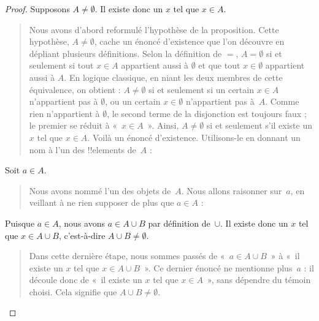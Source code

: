 \documentclass[../../../include/open-logic-section]{subfiles}
\begin{document}
\begin{proof}
  Supposons $A \neq \emptyset$. Il existe donc
  un $x$ tel que $x \in A$.
  \begin{quote}
    Nous avons d'abord reformulé l'hypothèse
    de la proposition. Cette hypothèse,
    $A \neq \emptyset$, cache un énoncé d'existence
    que l'on découvre en dépliant plusieurs
    définitions. Selon la définition de $=$,
    $A = \emptyset$ si et seulement si tout
    $x \in A$ appartient aussi à $\emptyset$
    et que tout $x \in \emptyset$ appartient
    aussi à $A$. En logique classique, en niant les deux
    membres de cette équivalence, on obtient :
    $A \neq \emptyset$ si et seulement si
    un certain $x \in A$ n'appartient pas
    à $\emptyset$, ou un certain
    $x \in \emptyset$ n'appartient pas à~$A$.
    Comme rien n'appartient à $\emptyset$,
    le second terme de la disjonction est
    toujours faux ; le premier se réduit
    à «~$x \in A$~». Ainsi,
    $A \neq \emptyset$ si et seulement s'il
    existe un $x$ tel que $x \in A$.
    Voilà un énoncé d'existence. Utilisons-le
    en donnant un nom à l'un des !!{element}s
    de~$A$ :
  \end{quote}
  Soit $a \in A$.
  \begin{quote}
    Nous avons nommé l'un des objets de~$A$.
    Nous allons raisonner sur~$a$, en veillant
    à ne rien supposer de plus que $a \in A$ :
  \end{quote}
  Puisque $a \in A$, nous avons
  $a \in A \cup B$ par définition de~$\cup$.
  Il existe donc un $x$ tel que $x \in A \cup B$,
  c'est-à-dire $A \cup B \neq \emptyset$.
  \begin{quote}
    Dans cette dernière étape, nous sommes
    passés de «~$a \in A \cup B$~» à
    «~il existe un $x$ tel que $x \in A \cup B$~».
    Ce dernier énoncé ne mentionne plus~$a$ :
    il découle donc de «~il existe un $x$ tel
    que $x \in A$~», sans dépendre du témoin
    choisi. Cela signifie que
    $A \cup B \neq \emptyset$.
  \end{quote}
\end{proof}
\end{document}
